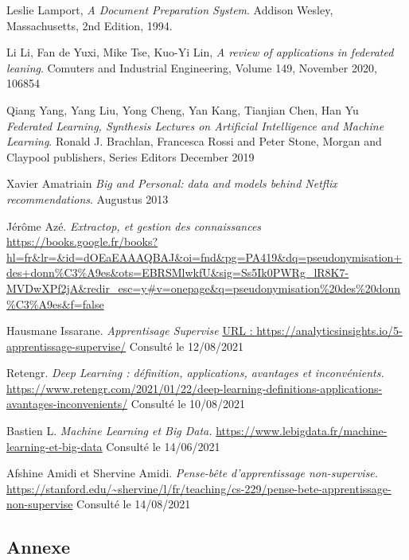 \documentclass[12pt,a4paper,french]{report}
\begin{document}
\begin{thebibliography}{9}

	  Leslie Lamport,
	  \emph{A Document Preparation System}.
	  Addison Wesley, Massachusetts,
	  2nd Edition,
	  1994.
	  
	  Li Li, Fan de Yuxi, Mike Tse, Kuo-Yi Lin,
	  \emph{A review of applications in federated leaning}.
	  Comuters and Industrial Engineering,
	  Volume 149,
	  November 2020,
	  106854
	  
	  Qiang Yang, Yang Liu, Yong Cheng, Yan Kang, Tianjian Chen, Han Yu
	  \emph{Federated Learning, Synthesis Lectures on Artificial Intelligence and Machine Learning}.
	  Ronald J. Brachlan, Francesca Rossi and Peter Stone,
	  Morgan and Claypool publishers,
	  Series Editors
	  December 2019
	  
	  Xavier Amatriain
	  \emph{Big and Personal: data and models behind Netflix recommendations}.
	  Augustus 2013
	  
	  Jérôme Azé.
	  \emph{Extractop, et gestion des connaissances}
	  \url{https://books.google.fr/books?hl=fr&lr=&id=dOEaEAAAQBAJ&oi=fnd&pg=PA419&dq=pseudonymisation+des+donn%C3%A9es&ots=EBRSMlwkfU&sig=Ss5Ik0PWRg_lR8K7-MVDwXPf2jA&redir_esc=y#v=onepage&q=pseudonymisation%20des%20donn%C3%A9es&f=false}
	  
	  Hausmane Issarane.
	  \emph{Apprentisage Supervise}
	  \url{URL : https://analyticsinsights.io/5-apprentissage-supervise/} Consulté le 12/08/2021
		  
	  Retengr.
	  \emph{Deep Learning : définition, applications, avantages et inconvénients.}
	  \url {https://www.retengr.com/2021/01/22/deep-learning-definitions-applications-avantages-inconvenients/}
	  Consulté le 10/08/2021
	  
	Bastien L.
	\emph{Machine Learning et Big Data.}
	\url {https://www.lebigdata.fr/machine-learning-et-big-data} Consulté le 14/06/2021
	
	Afshine Amidi et Shervine Amidi.
	\emph{Pense-bête d'apprentissage non-supervise.}
	\url{https://stanford.edu/~shervine/l/fr/teaching/cs-229/pense-bete-apprentissage-non-supervise} Consulté le 14/08/2021

\end{thebibliography}



 


\begin{appendix}
\chapter{Annexe}
 
\end{appendix}
\end{document}
